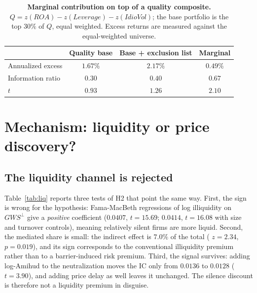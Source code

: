 \documentclass[12pt]{article}
\newcommand{\gwsp}{\ensuremath{\textit{GWS}^{\perp}}}
\begin{document}
\begin{table}[t]
\centering\small
\caption{\textbf{Marginal contribution on top of a quality composite.}
$Q = z(ROA) - z(\textit{Leverage}) - z(\textit{IdioVol})$; the base portfolio
is the top $30\%$ of $Q$, equal weighted. Excess returns are measured against
the equal-weighted universe.}
\label{tab:quality}
\vspace{6pt}
\begin{tabular}{lccc}
\toprule
& Quality base & Base + exclusion list & Marginal \\
\midrule
Annualized excess & $1.67\%$ & $2.17\%$ & $\mathbf{0.49\%}$ \\
Information ratio & $0.30$ & $0.40$ & $\mathbf{0.67}$ \\
$t$ & $0.93$ & $1.26$ & $\mathbf{2.10}$ \\
\bottomrule
\end{tabular}
\end{table}

\section{Mechanism: liquidity or price discovery?}

\subsection{The liquidity channel is rejected}
Table~\ref{tab:liq} reports three tests of H2 that point the same way. First,
the sign is wrong for the hypothesis: Fama-MacBeth regressions of log
\citet{amihud2002} illiquidity on \gwsp{} give a \emph{positive} coefficient
($0.0407$, $t=15.69$; $0.0414$, $t=16.08$ with size and turnover controls),
meaning relatively silent firms are more liquid. Second, the mediated share is
small: the indirect effect is $7.0\%$ of the total (\citealt{sobel1982} $z=2.34$,
$p=0.019$), and its sign corresponds to the conventional illiquidity premium
rather than to a barrier-induced risk premium. Third, the signal survives:
adding log-Amihud to the neutralization moves the IC only from $0.0136$ to
$0.0128$ ($t=3.90$), and adding price delay as well leaves it unchanged. The
silence discount is therefore not a liquidity premium in disguise.
\end{document}
